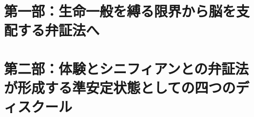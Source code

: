 



\frontmatter



\tableofcontents %

\mainmatter


\newpage

\chapter{第一部：生命一般を縛る限界から脳を支配する弁証法へ}


\newpage

\newpage



\newpage



\newpage

\newpage

\newpage


\chapter{第二部：体験とシニフィアンとの弁証法が形成する準安定状態としての四つのディスクール}


\newpage

\newpage



\newpage

\newpage

\newpage



\newpage


